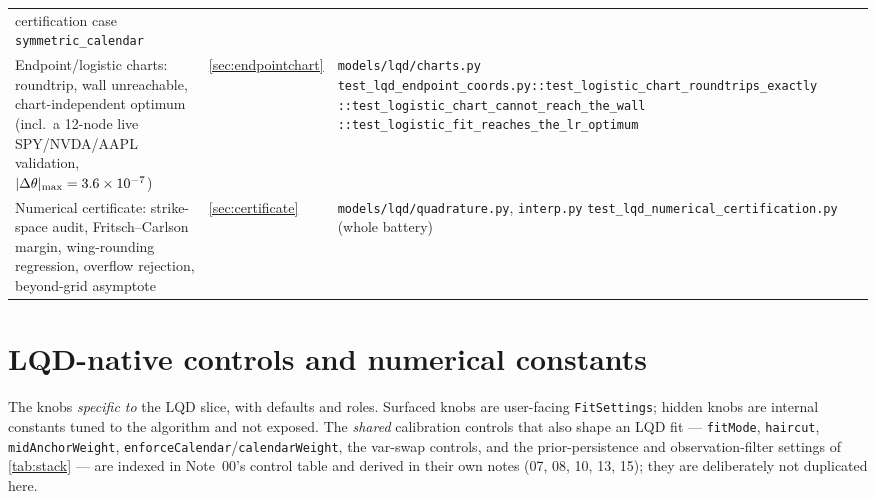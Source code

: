 \documentclass[11pt]{article}
\begin{document}
\begin{longtable}{@{}p{}p{}p{}@{}}
certification case \texttt{symmetric\_calendar}\\
\addlinespace
Endpoint/logistic charts: roundtrip, wall unreachable, chart-independent
optimum (incl.\ a 12-node live SPY/NVDA/AAPL validation,
$|\Delta\theta|_{\max}=3.6\times10^{-7}$) &
\cref{sec:endpointchart} &
\nolinkurl{models/lqd/charts.py}\newline
\nolinkurl{test_lqd_endpoint_coords.py::test_logistic_chart_roundtrips_exactly}\newline
\nolinkurl{::test_logistic_chart_cannot_reach_the_wall}\newline
\nolinkurl{::test_logistic_fit_reaches_the_lr_optimum}\\
\addlinespace
Numerical certificate: strike-space audit, Fritsch--Carlson margin,
wing-rounding regression, overflow rejection, beyond-grid asymptote &
\cref{sec:certificate} &
\nolinkurl{models/lqd/quadrature.py}, \nolinkurl{interp.py}\newline
\nolinkurl{test_lqd_numerical_certification.py} (whole battery)\\
\bottomrule
\end{longtable}
\endgroup

\appendix
\section{LQD-native controls and numerical constants}
\label{app:atlas}

The knobs \emph{specific to} the LQD slice, with defaults and roles.
Surfaced knobs are user-facing \texttt{FitSettings}; hidden knobs are
internal constants tuned to the algorithm and not exposed.  The \emph{shared}
calibration controls that also shape an LQD fit --- \texttt{fitMode},
\texttt{haircut}, \texttt{midAnchorWeight},
\texttt{enforceCalendar}/\texttt{calendarWeight}, the var-swap controls, and
the prior-persistence and observation-filter settings of \cref{tab:stack}
--- are indexed in Note~00's control table and derived in their own notes
(07, 08, 10, 13, 15); they are deliberately not duplicated here.
\end{document}
